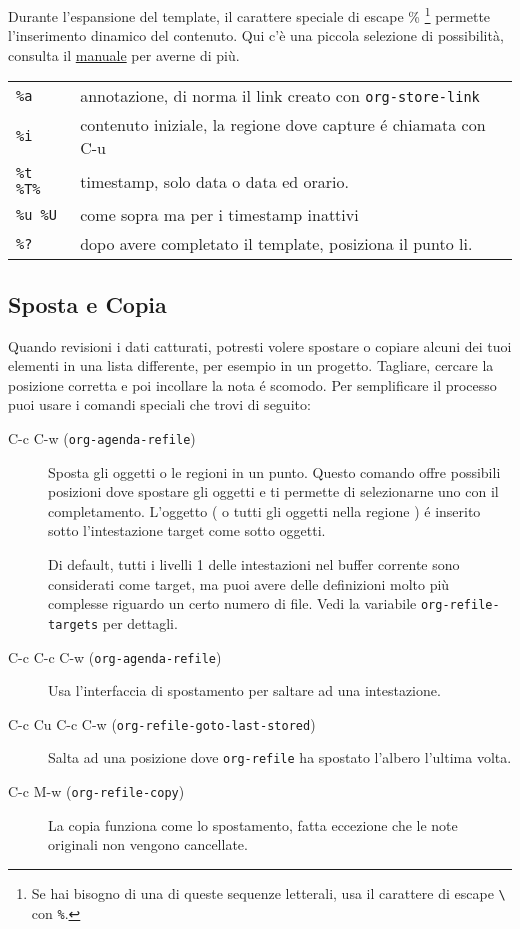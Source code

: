 \documentclass[11pt]{article}
\begin{document}
Durante l'espansione del template, il carattere speciale di escape
\% \footnote{Se hai bisogno di una di queste sequenze letterali, usa il
carattere di escape \texttt{\textbackslash{}} con \texttt{\%}.} permette l'inserimento dinamico del contenuto. Qui c'è una
piccola selezione di possibilità, consulta il \href{manual}{manuale} per averne di
più.

\begin{center}
\begin{tabular}{ll}
\texttt{\%a} & annotazione, di norma il link creato con \texttt{org-store-link}\\[0pt]
\texttt{\%i} & contenuto iniziale, la regione dove capture é chiamata con C-u\\[0pt]
\texttt{\%t \%T\%} & timestamp, solo data o data ed orario.\\[0pt]
\texttt{\%u \%U} & come sopra ma per i timestamp inattivi\\[0pt]
\texttt{\%?} & dopo avere completato il template, posiziona il punto li.\\[0pt]
\end{tabular}
\end{center}

\subsection{Sposta e Copia}
\label{sec:org2e2b0b8}
Quando revisioni i dati catturati, potresti volere spostare o copiare
alcuni dei tuoi elementi in una lista differente, per esempio in un
progetto. Tagliare, cercare la posizione corretta e poi incollare la
nota é scomodo. Per semplificare il processo puoi usare i comandi
speciali che trovi di seguito:

\begin{description}
\item[{C-c C-w (\texttt{org-agenda-refile})}] Sposta gli oggetti o le regioni in un punto. Questo comando offre
possibili posizioni dove spostare gli oggetti e ti permette di
selezionarne uno con il completamento. L'oggetto ( o tutti gli
oggetti nella regione ) é inserito sotto l'intestazione target come
sotto oggetti.

Di default, tutti i livelli 1 delle intestazioni nel buffer corrente
sono considerati come target, ma puoi avere delle definizioni molto
più complesse riguardo un certo numero di file. Vedi la variabile
\texttt{org-refile-targets} per dettagli.

\item[{C-c C-c C-w (\texttt{org-agenda-refile})}] Usa l'interfaccia di spostamento per saltare ad una intestazione.

\item[{C-c Cu C-c C-w (\texttt{org-refile-goto-last-stored})}] Salta ad una posizione dove \texttt{org-refile} ha spostato l'albero
l'ultima volta.

\item[{C-c M-w (\texttt{org-refile-copy})}] La copia funziona come lo spostamento, fatta eccezione che le note
originali non vengono cancellate.
\end{description}
\end{document}
